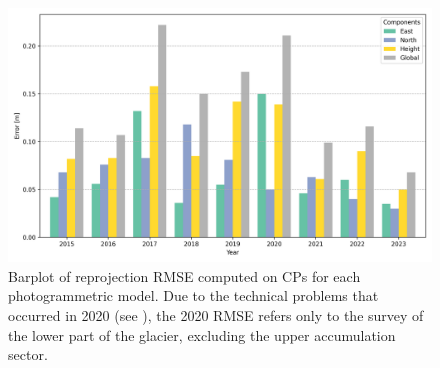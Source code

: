 \begin{figure}[ht!]
    \centering
    \includegraphics[width=0.9\columnwidth]{uav_cp_error.png}
    \caption{Barplot of reprojection RMSE computed on CPs for each photogrammetric
        model. Due to the technical problems that occurred in 2020 
        (see ), the 2020 RMSE refers only to the survey of
        the lower part of the glacier, excluding the upper accumulation sector.
    }
    \label{fig:3:CP_errors}
\end{figure}

